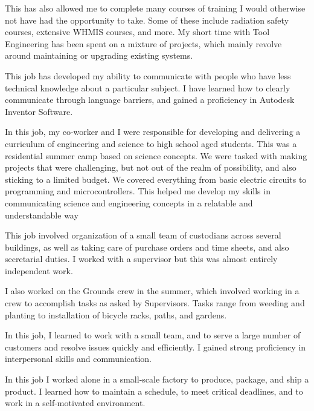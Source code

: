 \documentclass{curriculumVitae}
\begin{document}
This has also allowed me to complete many courses of training I would otherwise not have had the opportunity to take. Some of these include radiation safety courses, extensive WHMIS courses, and more. My short time with Tool Engineering has been spent on a mixture of projects, which mainly revolve around maintaining or upgrading existing systems.

This job has developed my ability to communicate with people who have less technical knowledge about a
particular subject. I have learned how to clearly communicate through language barriers, and
gained a proficiency in Autodesk Inventor Software.

 In this job, my co-worker and I were responsible for developing and delivering a curriculum of
engineering and science to high school aged students. This was a residential summer camp
based on science concepts. We were tasked with making projects that were challenging, but
not out of the realm of possibility, and also sticking to a limited budget. We covered
everything from basic electric circuits to programming and microcontrollers. This helped me
develop my skills in communicating science and engineering concepts in a relatable and
understandable way


This job involved organization of a small team of custodians across several buildings, as well as
taking care of purchase orders and time sheets, and also secretarial duties. I worked with a
supervisor but this was almost entirely independent work. 

I also worked on the Grounds crew in the summer, which involved working in a crew to accomplish tasks as asked by Supervisors. Tasks range from
weeding and planting to installation of bicycle racks, paths, and gardens.
 

In this job, I learned to work with a small team, and to serve a large number of customers and resolve issues quickly and efficiently. I gained strong proficiency in interpersonal skills and communication.
 

In this job I worked alone in a small-scale factory to produce, package, and ship a product. I learned how to maintain a schedule, to meet critical deadlines, and to work in a self-motivated environment.
\end{document}
